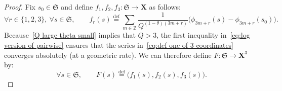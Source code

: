 \documentclass[10pt,a4paper]{amsart}
\newcommand{\X}{\mathbf X}
\newcommand{\Z}{\mathbb{Z}}
\newcommand{\eqdef}{\stackrel{\mathrm{def}}{=}}
\newcommand{\fS}{\mathfrak{S}}
\begin{document}
\begin{proof} Fix $s_0\in \fS$ and define $f_1,f_2,f_3:\fS\to \X$ as follows: 
\begin{equation}\label{eq:def one of 3 coordinates}
\forall r\in \{1,2,3\},\ \forall s\in \fS,\qquad f_r(s)\eqdef \sum_{m\in \Z} \frac{1}{Q^{(1-\theta)(3m+r)}}\big(\phi_{3m+r}(s)-\phi_{3m+r}(s_0)\big).
\end{equation}
Because~\eqref{Q large theta small} implies that $Q> 3$, the first inequality in~\eqref{eq:log version of pairwise} ensures that the  series  in~\eqref{eq:def one of 3 coordinates} converges absolutely   (at a geometric rate). We can therefore define $F:\fS\to \X^3$ by:
\begin{equation}\label{eq:defF}
\forall s\in \fS,\qquad F(s)\eqdef \big(f_1(s),f_2(s),f_3(s)\big).
\end{equation}




\end{proof}
\end{document}

